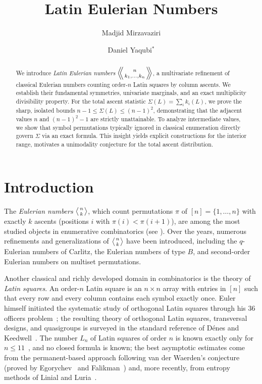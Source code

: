 \documentclass[11pt]{amsart}
\title[Latin Eulerian Numbers]{Latin Eulerian Numbers}
\author{Madjid Mirzavaziri}
\author{Daniel Yaqubi$^{*}$}
\newcommand{\LE}[1]{\left\langle\!\!\left\langle #1 \right\rangle\!\!\right\rangle}
\newcommand{\EN}[1]{\left\langle #1 \right\rangle}
\begin{document}
\begin{abstract}
We introduce \emph{Latin Eulerian numbers} $\LE{n\atop k_1,\dots,k_n}$, a multivariate refinement of classical Eulerian numbers counting order-$n$ Latin squares by column ascents. We establish their fundamental symmetries, univariate marginals, and an exact multiplicity divisibility property. For the total ascent statistic $\Sigma(L)=\sum_i k_i(L)$, we prove the sharp, isolated bounds $n-1 \le \Sigma(L) \le (n-1)^2$, demonstrating that the adjacent values $n$ and $(n-1)^2-1$ are strictly unattainable. To analyze intermediate values, we show that symbol permutations typically ignored in classical enumeration directly govern $\Sigma$ via an exact formula. This insight yields explicit constructions for the interior range, motivates a unimodality conjecture for the total ascent distribution.
\end{abstract}

\maketitle

\section{Introduction}
The \textit{Eulerian numbers} $\EN{n\atop k}$, which count permutations $\pi$ of $[n]=\{1,\dots,n\}$ with exactly $k$ ascents (positions $i$ with $\pi(i)<\pi(i+1)$), are among the most studied objects in enumerative combinatorics (see \cite{Comtet, Riordan, StanleyEC1, Petersen}). Over the years, numerous refinements and generalizations of $\EN{n\atop k}$ have been introduced, including the $q$-Eulerian numbers of Carlitz, the Eulerian numbers of type $B$, and second-order Eulerian numbers on multiset permutations.

Another classical and richly developed domain in combinatorics is the theory of \textit{Latin squares}. An order-$n$ Latin square is an $n\times n$ array with entries in $[n]$ such that every row and every column contains each symbol exactly once. Euler himself initiated the systematic study of orthogonal Latin squares through his $36$ officers problem~\cite{EulerOfficers}; the resulting theory of orthogonal Latin squares, transversal designs, and quasigroups is surveyed in the standard reference of D\'enes and Keedwell~\cite{DenesKeedwell}. The number $L_n$ of Latin squares of order $n$ is known exactly only for $n\le 11$~\cite{McKayWanless}, and no closed formula is known; the best asymptotic estimates come from the permanent-based approach following van der Waerden's conjecture (proved by Egorychev~\cite{Egorychev} and Falikman~\cite{Falikman}) and, more recently, from entropy methods of Linial and Luria~\cite{LinialLuria}.
\end{document}
